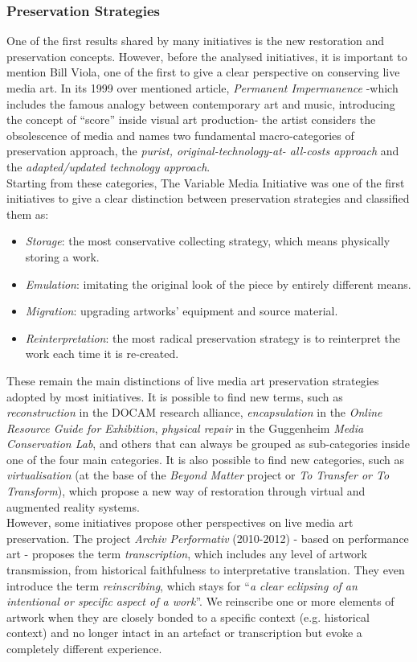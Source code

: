\subsubsection{Preservation Strategies}
One of the first results shared by many initiatives is the new restoration and preservation concepts. However, before the analysed initiatives, it is important to mention Bill Viola, one of the first to give a clear perspective on conserving live media art. In its 1999 over mentioned article, \textit{Permanent Impermanence} \cite{viola1999permanent} -which includes the famous analogy between contemporary art and music, introducing the concept of ``score'' inside visual art production- the artist considers the obsolescence of media and names two fundamental macro-categories of preservation approach, the \textit{purist, original-technology-at- all-costs approach} and the \textit{adapted/updated technology approach}.\\
Starting from these categories, The Variable Media Initiative was one of the first initiatives to give a clear distinction between preservation strategies and classified them as:
\begin{itemize}
    \item \textit{Storage}: the most conservative collecting strategy, which means physically storing a work.
    \item \textit{Emulation}: imitating the original look of the piece by entirely different means.
    \item \textit{Migration}: upgrading artworks’ equipment and source material. 
    \item \textit{Reinterpretation}: the most radical preservation strategy is to reinterpret the work each time it is re-created.
\end{itemize}
These remain the main distinctions of live media art preservation strategies adopted by most initiatives. It is possible to find new terms, such as \textit{reconstruction} in the DOCAM research alliance, \textit{encapsulation} in the \textit{Online Resource Guide for Exhibition}, \textit{physical repair} in the Guggenheim \textit{Media Conservation Lab}, and others that can always be grouped as sub-categories inside one of the four main categories. It is also possible to find new categories, such as \textit{virtualisation} (at the base of the \textit{Beyond Matter} project or \textit{To Transfer or To Transform}), which propose a new way of restoration through virtual and augmented reality systems.\\
However, some initiatives propose other perspectives on live media art preservation. The project \textit{Archiv Performativ} (2010-2012) - based on performance art - proposes the term \textit{transcription}, which includes any level of artwork transmission, from historical faithfulness to interpretative translation. They even introduce the term \textit{reinscribing}, which stays for ``\textit{a clear eclipsing of an intentional or specific aspect of a work}''. We reinscribe one or more elements of artwork when they are closely bonded to a specific context (e.g. historical context) and no longer intact in an artefact or transcription but evoke a completely different experience.\\
